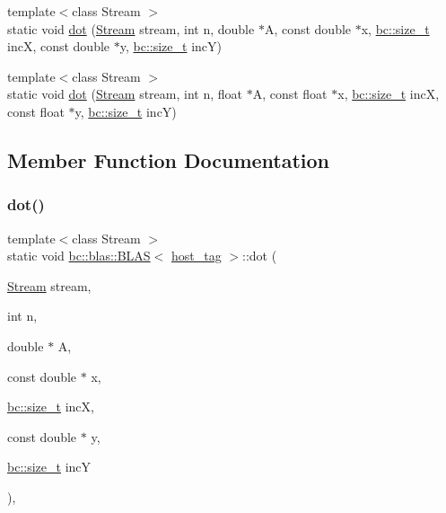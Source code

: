 \begin{DoxyCompactItemize}
\item 
{\footnotesize template$<$class Stream $>$ }\\static void \hyperlink{structbc_1_1blas_1_1BLAS_3_01host__tag_01_4_a2b190ef7608a582f3c99275db0347c9d}{dot} (\hyperlink{classbc_1_1streams_1_1Stream}{Stream} stream, int n, double $\ast$A, const double $\ast$x, \hyperlink{namespacebc_aaf8e3fbf99b04b1b57c4f80c6f55d3c5}{bc\+::size\+\_\+t} incX, const double $\ast$y, \hyperlink{namespacebc_aaf8e3fbf99b04b1b57c4f80c6f55d3c5}{bc\+::size\+\_\+t} incY)
\item 
{\footnotesize template$<$class Stream $>$ }\\static void \hyperlink{structbc_1_1blas_1_1BLAS_3_01host__tag_01_4_a9e497c6a7b2588a5451c5f2492282392}{dot} (\hyperlink{classbc_1_1streams_1_1Stream}{Stream} stream, int n, float $\ast$A, const float $\ast$x, \hyperlink{namespacebc_aaf8e3fbf99b04b1b57c4f80c6f55d3c5}{bc\+::size\+\_\+t} incX, const float $\ast$y, \hyperlink{namespacebc_aaf8e3fbf99b04b1b57c4f80c6f55d3c5}{bc\+::size\+\_\+t} incY)
\end{DoxyCompactItemize}


\subsection{Member Function Documentation}
\mbox{\label{structbc_1_1blas_1_1BLAS_3_01host__tag_01_4_a2b190ef7608a582f3c99275db0347c9d}} 
\subsubsection{\texorpdfstring{dot()}{dot()}\hspace{0.1cm}{\footnotesize\ttfamily [1/2]}}
{\footnotesize\ttfamily template$<$class Stream $>$ \\
static void \hyperlink{structbc_1_1blas_1_1BLAS}{bc\+::blas\+::\+B\+L\+AS}$<$ \hyperlink{structbc_1_1host__tag}{host\+\_\+tag} $>$\+::dot (\begin{DoxyParamCaption}\item[{\hyperlink{classbc_1_1streams_1_1Stream}{Stream}}]{stream,  }\item[{int}]{n,  }\item[{double $\ast$}]{A,  }\item[{const double $\ast$}]{x,  }\item[{\hyperlink{namespacebc_aaf8e3fbf99b04b1b57c4f80c6f55d3c5}{bc\+::size\+\_\+t}}]{incX,  }\item[{const double $\ast$}]{y,  }\item[{\hyperlink{namespacebc_aaf8e3fbf99b04b1b57c4f80c6f55d3c5}{bc\+::size\+\_\+t}}]{incY }\end{DoxyParamCaption})\hspace{0.3cm}{\ttfamily [inline]}, {\ttfamily [static]}}


